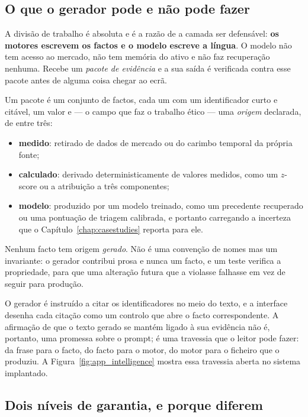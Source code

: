 \subsection{O que o gerador pode e não pode fazer}

A divisão de trabalho é absoluta e é a razão de a camada ser defensável: \textbf{os motores escrevem
os factos e o modelo escreve a língua}. O modelo não tem acesso ao mercado, não tem memória do ativo
e não faz recuperação nenhuma. Recebe um \emph{pacote de evidência} e a sua saída é verificada contra
esse pacote antes de alguma coisa chegar ao ecrã.

Um pacote é um conjunto de factos, cada um com um identificador curto e citável, um valor e --- o
campo que faz o trabalho ético --- uma \emph{origem} declarada, de entre três:

\begin{itemize}
  \item \textbf{medido}: retirado de dados de mercado ou do carimbo temporal da própria fonte;
  \item \textbf{calculado}: derivado deterministicamente de valores medidos, como um $z$-score ou a
        atribuição a três componentes;
  \item \textbf{modelo}: produzido por um modelo treinado, como um precedente recuperado ou uma
        pontuação de triagem calibrada, e portanto carregando a incerteza que o
        Capítulo~\ref{chap:casestudies} reporta para ele.
\end{itemize}

Nenhum facto tem origem \emph{gerado}. Não é uma convenção de nomes mas um invariante: o gerador
contribui prosa e nunca um facto, e um teste verifica a propriedade, para que uma alteração futura
que a violasse falhasse em vez de seguir para produção.

O gerador é instruído a citar os identificadores no meio do texto, e a interface desenha cada citação
como um controlo que abre o facto correspondente. A afirmação de que o texto gerado se mantém ligado
à sua evidência não é, portanto, uma promessa sobre o prompt; é uma travessia que o leitor pode
fazer: da frase para o facto, do facto para o motor, do motor para o ficheiro que o produziu.
A Figura~\ref{fig:app_intelligence} mostra essa travessia aberta no sistema implantado.

\subsection{Dois níveis de garantia, e porque diferem}

